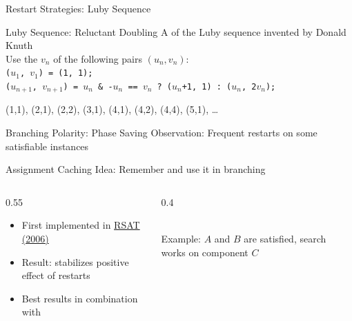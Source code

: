 \documentclass[t]{sdqbeamer2}
\begin{document}
\begin{frame}{Restart Strategies: Luby Sequence}
\begin{block}{Luby Sequence: Reluctant Doubling}
A  of the Luby sequence invented by Donald Knuth\\[1ex]
Use the $v_n$ of the following pairs $(u_n, v_n)$:\\[1ex]
\texttt{($u_1$, $v_1$) = (1, 1);}\\
\texttt{($u_{n+1}$, $v_{n+1}$) = $u_n$ \& -$u_n$ == $v_n$\ ?\ ($u_n$+1, 1) :\ ($u_n$, 2$v_n$);}
\end{block}
\begin{example}
(1,1), (2,1), (2,2), (3,1), (4,1), (4,2), (4,4), (5,1), \ldots
\end{example}
\end{frame}


		
\begin{frame}{Branching Polarity: Phase Saving}
Observation: Frequent {restarts}  on some satisfiable instances\\[1em]
\begin{block}{Assignment Caching}
Idea: Remember  and use it  in branching
\begin{columns}[T]
\begin{column}{0.55\textwidth}
\begin{itemize}\setlength{\itemsep}{1em}
	\item First implemented in \href{http://reasoning.cs.ucla.edu/rsat/}{RSAT (2006)}
	\item Result:  stabilizes positive effect of restarts
	\item Best results in combination with 
\end{itemize}
\end{column}
\begin{column}{0.4\textwidth}
\centering
{}~\\
Example: $A$ and $B$ are satisfied, search works on component $C$
\end{column}
\end{columns}
\end{block}
\end{frame}
\end{document}

